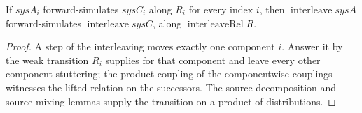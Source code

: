 \begin{theorem}
  \label{thm:precong-interleave}
  \leanok
  If $sysA_i$ forward-simulates $sysC_i$ along $R_i$ for every index $i$, then
  $\operatorname{interleave} sysA$ forward-simulates
  $\operatorname{interleave} sysC$, along $\operatorname{interleaveRel} R$.
\end{theorem}

\begin{proof}\leanok
  A step of the interleaving moves exactly one component $i$. Answer it by the
  weak transition $R_i$ supplies for that component and leave every other
  component stuttering; the product coupling of the componentwise couplings
  witnesses the lifted relation on the successors. The source-decomposition and
  source-mixing lemmas supply the transition on a product of distributions.
\end{proof}
